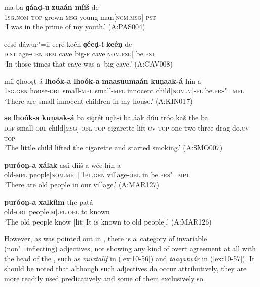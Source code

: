 \begin{exe}
\ex
\label{ex:10-50}
\gll ma ba \textbf{ɡáaḍ-u} \textbf{zuaán} \textbf{míiš} de \\
\textsc{1sg.nom} \textsc{top} grown-\textsc{msg} young man[\textsc{nom}.\textsc{msg}] \textsc{pst} \\
\glt `I was in the prime of my youth.' (A:PAS004)

\ex
\label{ex:10-51}
\gll eesé dáwur"=ii eeṛé keéṇ \textbf{ɡéeḍ-i} \textbf{keéṇ} de \\
\textsc{dist} age-\textsc{gen} \textsc{rem} cave big-\textsc{f} cave[\textsc{nom}.\textsc{fsg}] be.\textsc{pst} \\
\glt `In those times that cave was a~big cave.' (A:CAV008)

\ex
\label{ex:10-52}
\gll míi ɡhooṣṭ-á \textbf{lhoók-a} \textbf{lhoók-a} \textbf{maasuumaán} \textbf{kuṇaak-á} hín-a \\
\textsc{1sg.gen} house-\textsc{obl} small-\textsc{mpl} small-\textsc{mpl}  innocent child[\textsc{nom.m}]-\textsc{pl} be.\textsc{prs"=mpl}\\
\glt `There are small innocent children in my house.' (A:KIN017)

\ex
\label{ex:10-53}
\gll \textbf{se} \textbf{lhoók-a} \textbf{kuṇaak-á} ba siɡréṭ uc̣h-í ba áak dúu tróo kaš the ba \\
\textsc{def} small-\textsc{obl} child[\textsc{msg}]-\textsc{obl} \textsc{top} cigarette lift-\textsc{cv} \textsc{top } one two three drag do.\textsc{cv} \textsc{top}  \\
\glt `The little child lifted the cigarette and started smoking.' (A:SMO007)

\ex
\label{ex:10-54}
\gll \textbf{puróoṇ-a} \textbf{xálak} asíi díiš-a wée hín-a \\
old-\textsc{mpl} people[\textsc{nom.mpl}] \textsc{1pl.gen} village-\textsc{obl} in be.\textsc{prs"=mpl} \\
\glt `There are old people in our village.' (A:MAR127)

\ex
\label{ex:10-55}
\gll \textbf{puróoṇ-a} \textbf{xalkíim} the patá \\
old-\textsc{obl} people[\textsc{m}].\textsc{pl.obl} to known \\
\glt `The old people know [lit: It is known to old people].' (A:MAR126)
\end{exe}


However, as was pointed out in , there is a~category of invariable (non"=inflecting) adjectives, not showing any kind of overt agreement at all with the head of the  , such as \textit{muxtalíf} in (\ref{ex:10-56}) and \textit{taaqatwár} in (\ref{ex:10-57}). It should be noted that although such adjectives do occur attributively, they are more readily used predicatively and some of them exclusively so.

